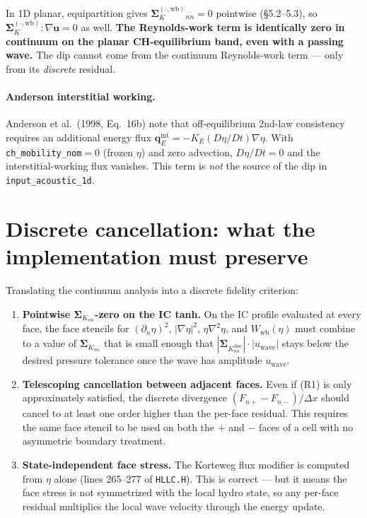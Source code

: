\documentclass[11pt]{article}
\newcommand{\grad}{\nabla}
\newcommand{\uu}{\mathbf{u}}
\newcommand{\SK}{\boldsymbol{\Sigma}_K}
\newcommand{\dxn}{\partial_n}
\newcommand{\Wb}{W_{\!\mathrm{wb}}}
\begin{document}
In 1D planar, equipartition gives $\SK^{(\cdot,\mathrm{wb})}_{nn}=0$
pointwise (\S5.2--5.3), so $\SK^{(\cdot,\mathrm{wb})}\!:\!\grad\uu = 0$ as well.
\textbf{The Reynolds-work term is identically zero in continuum on the
planar CH-equilibrium band, even with a passing wave.} The dip cannot
come from the continuum Reynolds-work term --- only from its
\emph{discrete} residual.

\paragraph{Anderson interstitial working.} Anderson et al.\ (1998,
Eq.~16b) note that off-equilibrium 2nd-law consistency requires an
additional energy flux $\mathbf q_E^{\mathrm{int}} = -K_E (D\eta/Dt)\grad\eta$.
With \texttt{ch\_mobility\_nom}$=0$ (frozen $\eta$) and zero advection,
$D\eta/Dt = 0$ and the interstitial-working flux vanishes. This term is
\emph{not} the source of the dip in \texttt{input\_acoustic\_1d}.

\section{Discrete cancellation: what the implementation must preserve}

Translating the continuum analysis into a discrete fidelity criterion:

\begin{enumerate}
\item[(R1)] \textbf{Pointwise $\SK_{nn}$-zero on the IC tanh.} On the IC
profile evaluated at every face, the face stencils for
$(\dxn\eta)^2$, $|\grad\eta|^2$, $\eta\grad^2\eta$, and $\Wb(\eta)$
must combine to a value of $\SK_{nn}$ that is small enough that
$|\SK_{nn}^{\mathrm{disc}}|\!\cdot\!|u_{\mathrm{wave}}|$ stays below the
desired pressure tolerance once the wave has amplitude $u_{\mathrm{wave}}$.
\item[(R2)] \textbf{Telescoping cancellation between adjacent faces.}
Even if (R1) is only approximately satisfied, the discrete divergence
$(F_{n+}-F_{n-})/\Delta x$ should cancel to at least one order higher
than the per-face residual. This requires the same face stencil to be
used on both the $+$ and $-$ faces of a cell with no asymmetric
boundary treatment.
\item[(R3)] \textbf{State-independent face stress.} The Korteweg flux
modifier is computed from $\eta$ alone (lines 265--277 of
\texttt{HLLC.H}). This is correct --- but it means the face stress is
not symmetrized with the local hydro state, so any per-face residual
multiplies the local wave velocity through the energy update.
\end{enumerate}
\end{document}
